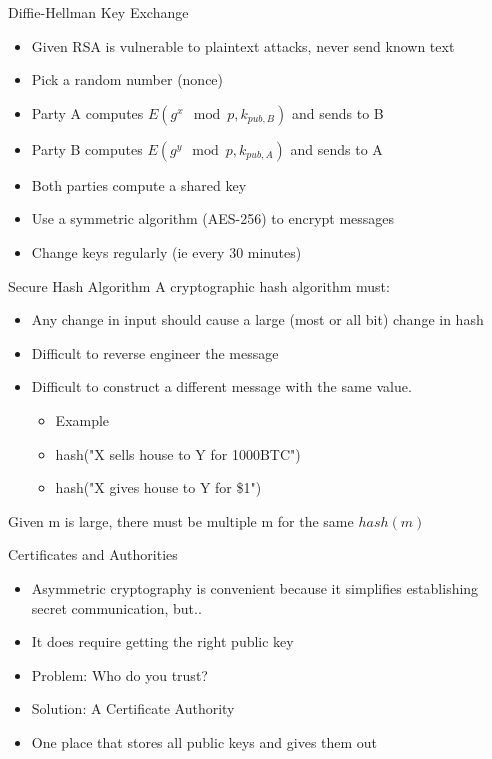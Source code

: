 \begin{withoutheadline}
\begin{frame}{Diffie-Hellman Key Exchange}
    \begin{itemize}
        \item Given RSA is vulnerable to plaintext attacks, never send known text
        \item Pick a random number (nonce)
        \item Party A computes $E(g^x \mod p, k_{pub,B})$ and sends to B
        \item Party B computes $E(g^y \mod p, k_{pub,A})$ and sends to A
        \item Both parties compute a shared key
        \item Use a symmetric algorithm (AES-256) to encrypt messages
        \item Change keys regularly (ie every 30 minutes)
    \end{itemize}
\end{frame}

\begin{frame}{Secure Hash Algorithm}
    A cryptographic hash algorithm must:
    \begin{itemize}
        \item Any change in input should cause a large (most or all bit) change in hash
        \item Difficult to reverse engineer the message
        \item Difficult to construct a different message with the same value.
        \begin{itemize}
            \item Example
            \item hash("X sells house to Y for 1000BTC") %
            \item hash("X gives house to Y for \$1")     %
        \end{itemize}
    \end{itemize}
    Given m is large, there must be multiple m for the same $hash(m)$
\end{frame}

\begin{frame}{Certificates and Authorities}
    \begin{itemize}
        \item Asymmetric cryptography is convenient because it simplifies establishing secret communication, but..
        \item It does require getting the right public key
        \item Problem: Who do you trust?
        \item Solution: A Certificate Authority
        \item One place that stores all public keys and gives them out
    \end{itemize}
\end{frame}



\end{withoutheadline}
